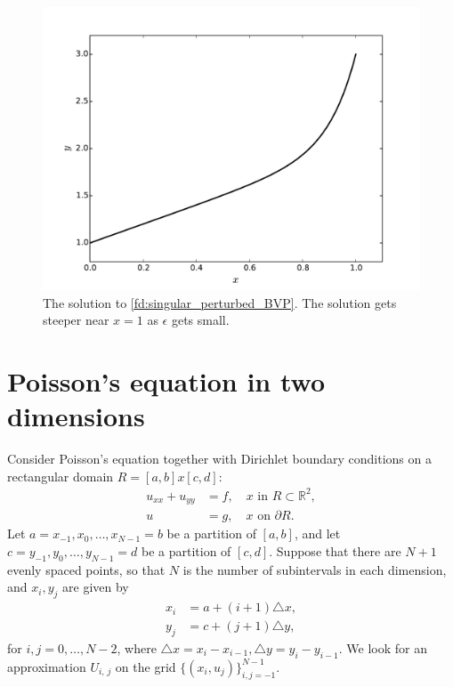 \begin{figure}[ht]
\centering
\includegraphics[width=12cm]{figure2.pdf}
\caption{The solution to \eqref{fd:singular_perturbed_BVP}. The solution gets steeper near $x = 1$ as $\epsilon $ gets small. }
\label{figure2}
\end{figure}



\section{Poisson's equation in two dimensions}

 Consider Poisson's equation together with Dirichlet boundary conditions on a rectangular  domain $R = [a,b] x [c,d]$:
 \begin{align*}
 	u_{xx} + u_{yy} &= f,\quad x \text{ in } R \subset \mathbb{R}^2,\\
 	u &= g, \quad x \text{ on } \partial R.
 \end{align*}
Let $a = x_{-1}, x_0, \ldots, x_{N-1} = b$ be a partition of $[a,b]$, and let $c = y_{-1}, y_0, \ldots, y_{N-1} = d$ be a partition of $[c,d]$. Suppose that there are $N+1$ evenly spaced points, so that $N$ is the number of subintervals in each dimension, and $x_i, y_j$ are given by 
\begin{align*}
	x_i &= a + (i+1)\triangle x, \\
	y_j &= c + (j+1)\triangle y,
\end{align*}
for $i,j = 0, \ldots, N-2$, where $\triangle x = x_i-x_{i-1}, \triangle y = y_i-y_{i-1}$. We look for an approximation $U_{i,\,j}$ on the grid $\{(x_i,u_j)\}_{i,j=-1}^{N-1}$.

